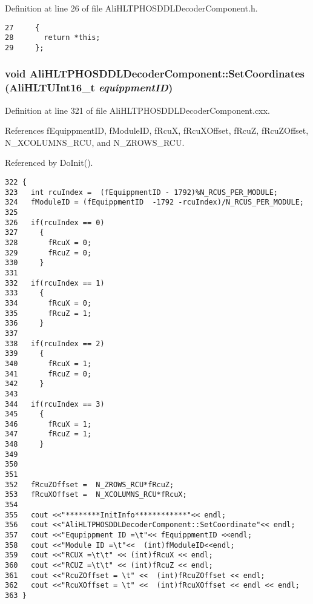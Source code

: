 Definition at line 26 of file Ali\-HLTPHOSDDLDecoder\-Component.h.

\footnotesize\begin{verbatim}27     {
28       return *this;
29     };
\end{verbatim}\normalsize 


\subsubsection{\setlength{\rightskip}{0pt plus 5cm}void Ali\-HLTPHOSDDLDecoder\-Component::Set\-Coordinates ({\bf Ali\-HLTUInt16\_\-t} {\em equippment\-ID})}\label{classAliHLTPHOSDDLDecoderComponent_a9}




Definition at line 321 of file Ali\-HLTPHOSDDLDecoder\-Component.cxx.

References f\-Equippment\-ID, f\-Module\-ID, f\-Rcu\-X, f\-Rcu\-XOffset, f\-Rcu\-Z, f\-Rcu\-ZOffset, N\_\-XCOLUMNS\_\-RCU, and N\_\-ZROWS\_\-RCU.

Referenced by Do\-Init().

\footnotesize\begin{verbatim}322 {
323   int rcuIndex =  (fEquippmentID - 1792)%N_RCUS_PER_MODULE;
324   fModuleID = (fEquippmentID  -1792 -rcuIndex)/N_RCUS_PER_MODULE;
325   
326   if(rcuIndex == 0)
327     {
328       fRcuX = 0; 
329       fRcuZ = 0;
330     }
331 
332   if(rcuIndex == 1)
333     {
334       fRcuX = 0; 
335       fRcuZ = 1;
336     }
337  
338   if(rcuIndex == 2)
339     {
340       fRcuX = 1; 
341       fRcuZ = 0;
342     }
343 
344   if(rcuIndex == 3)
345     {
346       fRcuX = 1; 
347       fRcuZ = 1;
348     }
349 
350 
351 
352   fRcuZOffset =  N_ZROWS_RCU*fRcuZ;
353   fRcuXOffset =  N_XCOLUMNS_RCU*fRcuX;
354 
355   cout <<"********InitInfo************"<< endl;
356   cout <<"AliHLTPHOSDDLDecoderComponent::SetCoordinate"<< endl;
357   cout <<"Equpippment ID =\t"<< fEquippmentID <<endl;
358   cout <<"Module ID =\t"<<  (int)fModuleID<<endl;
359   cout <<"RCUX =\t\t" << (int)fRcuX << endl;
360   cout <<"RCUZ =\t\t" << (int)fRcuZ << endl;
361   cout <<"RcuZOffset = \t" <<  (int)fRcuZOffset << endl;
362   cout <<"RcuXOffset = \t" <<  (int)fRcuXOffset << endl << endl;
363 }
\end{verbatim}\normalsize 



